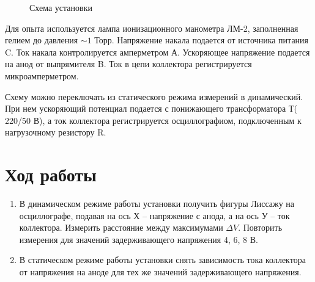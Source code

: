 \documentclass[12pt,a4paper]{article}
\begin{document}
\begin{figure} \label{fullscheme} 
\vspace{-5ex}  
\caption{Схема установки}
\end{figure}


Для опыта используется лампа ионизационного манометра ЛМ-2, заполненная гелием до давления $\sim 1$ Торр. Напряжение накала подается от источника питания C. Ток накала контролируется амперметром А. Ускоряющее напряжение подается на анод от выпрямителя B. Ток в цепи коллектора регистрируется микроамперметром.

Схему можно переключать из статического режима измерений в динамический. При нем ускоряющий потенциал подается с понижающего трансформатора Т( 220/50 В), а ток коллектора регистрируется осциллографиом, подключенным к нагрузочному резистору R. 

\section{Ход работы}

\begin{enumerate}
\item В динамическом режиме работы установки получить фигуры Лиссажу на осциллографе, подавая на ось Х -- напряжение с анода, а на ось У -- ток коллектора. Измерить расстояние между максимумами $\Delta V$. Повторить измерения для значений задерживающего напряжения 4, 6, 8 В.
\item В статическом режиме работы установки снять зависимость тока коллектора от напряжения на аноде для тех же значений задерживающего напряжения.
\end{enumerate}
\end{document}
